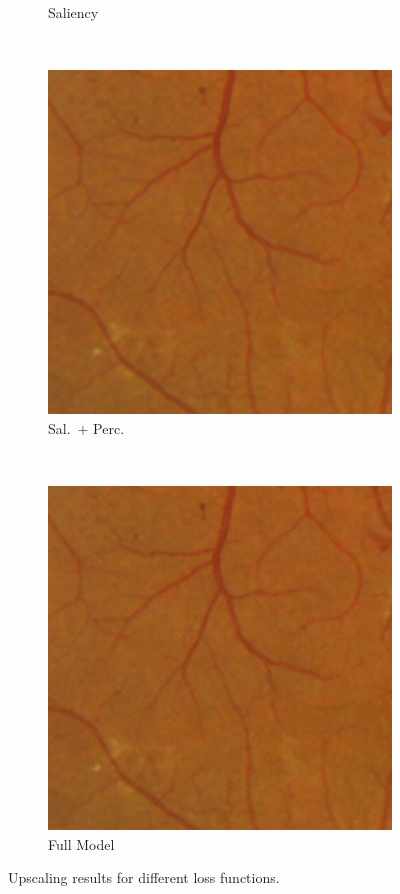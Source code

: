 \documentclass{scrartcl}
\begin{document}
\begin{figure}[htb]
{\begin{subfigure}{0.2\textwidth}
    \caption{Saliency}
\end{subfigure}~
\begin{subfigure}{0.2\textwidth}
\centering
    \includegraphics[width=1.0\textwidth]{patch_sr1_sal_perc}
    \caption{Sal.\ + Perc.}
\end{subfigure}~
\begin{subfigure}{0.2\textwidth}
\centering
    \includegraphics[width=1.0\textwidth]{patch_sr1_gan}
    \caption{Full Model}
\end{subfigure}
}
\caption{Upscaling results for different loss functions.}
\label{fig:messidor-example}
\end{figure}
\end{document}
